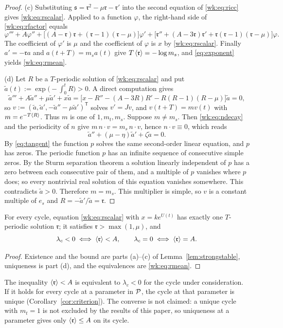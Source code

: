 \begin{proof}
(c) Substituting $\mathfrak s=\mathfrak r^2-\mu\mathfrak r-\mathfrak r'$ into the second equation of \eqref{wk:eq:ricc} gives \eqref{wk:eq:rscalar}. Applied to a function $\varphi$, the right-hand side of \eqref{wk:eq:rfactor} equals
\[
\varphi'''+A\varphi''+\bigl[(A-\mathfrak r)\mathfrak r+(\mathfrak r-1)(\mathfrak r-\mu)\bigr]\varphi'
+\bigl[\mathfrak r''+(A-3\mathfrak r)\mathfrak r'+\mathfrak r(\mathfrak r-1)(\mathfrak r-\mu)\bigr]\varphi .
\]
The coefficient of $\varphi'$ is $\mu$ and the coefficient of $\varphi$ is $x$ by \eqref{wk:eq:rscalar}. Finally $a'=-\mathfrak ra$ and $a(t+T)=m_sa(t)$ give $T\left\langle \mathfrak r\right\rangle=-\log m_s$, and \eqref{eq:exponent} yields \eqref{wk:eq:rmean}.

(d) Let $R$ be a $T$-periodic solution of \eqref{wk:eq:rscalar} and put $\tilde a(t):=\exp\bigl(-\int_0^tR\bigr)>0$. A direct computation gives
\[
\tilde a'''+A\tilde a''+\mu\tilde a'+x\tilde a=\bigl[x-R''-(A-3R)R'-R(R-1)(R-\mu)\bigr]\tilde a=0 ,
\]
so $v:=(\tilde a,\tilde a',-\tilde a''-\mu\tilde a')^{\mathsf T}$ solves $v'=Jv$, and $v(t+T)=mv(t)$ with $m=e^{-T\left\langle R\right\rangle}$. Thus $m$ is one of $1,m_t,m_s$. Suppose $m\ne m_s$. Then \eqref{wk:eq:ndecay} and the periodicity of $n$ give $m\,n\cdot v=m_s\,n\cdot v$, hence $n\cdot v\equiv0$, which reads
\[
\tilde a''+(\mu-\eta)\tilde a'+\zeta\tilde a=0 .
\]
By \eqref{eq:tangent} the function $p$ solves the same second-order linear equation, and $p$ has zeros. The periodic function $p$ has an infinite sequence of consecutive simple zeros. By the Sturm separation theorem a solution linearly independent of $p$ has a zero between each consecutive pair of them, and a multiple of $p$ vanishes where $p$ does; so every nontrivial real solution of this equation vanishes somewhere. This contradicts $\tilde a>0$. Therefore $m=m_s$. This multiplier is simple, so $v$ is a constant multiple of $e_s$ and $R=-\tilde a'/\tilde a=\mathfrak r$.
\end{proof}

\begin{corollary}\label{wk:cor:reform}
For every cycle, equation \eqref{wk:eq:rscalar} with $x=ke^{U(t)}$ has exactly one $T$-periodic solution $\mathfrak r$; it satisfies $\mathfrak r>\max(1,\mu)$, and
\[
\lambda_c<0\iff\left\langle \mathfrak r\right\rangle<A,\qquad\lambda_c=0\iff\left\langle \mathfrak r\right\rangle=A .
\]
\end{corollary}
\begin{proof}
Existence and the bound are parts (a)--(c) of Lemma~\ref{lem:strongstable}, uniqueness is part (d), and the equivalences are \eqref{wk:eq:rmean}.
\end{proof}
The inequality $\left\langle \mathfrak r\right\rangle<A$ is equivalent to $\lambda_c<0$ for the cycle under consideration. If it holds for every cycle at a parameter in $\mathcal P$, the cycle at that parameter is unique (Corollary~\ref{cor:criterion}). The converse is not claimed: a unique cycle with $m_t=1$ is not excluded by the results of this paper, so uniqueness at a parameter gives only $\left\langle \mathfrak r\right\rangle\le A$ on its cycle.

